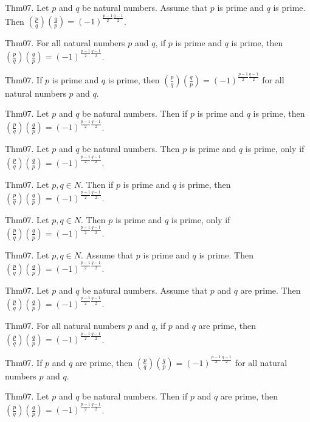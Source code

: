 \documentclass{article}
\begin{document}
Thm07. Let $p$ and $q$ be natural numbers. Assume that $p$ is prime and $q$ is prime. Then $\left(\frac{ p }{ q }\right) \left(\frac{ q }{ p }\right) = (- 1)^ {\frac{ p - 1}{2}\frac{ q - 1}{2}}$.

Thm07. For all natural numbers $p$ and $q$, if $p$ is prime and $q$ is prime, then $\left(\frac{ p }{ q }\right) \left(\frac{ q }{ p }\right) = (- 1)^ {\frac{ p - 1}{2}\frac{ q - 1}{2}}$.

Thm07. If $p$ is prime and $q$ is prime, then $\left(\frac{ p }{ q }\right) \left(\frac{ q }{ p }\right) = (- 1)^ {\frac{ p - 1}{2}\frac{ q - 1}{2}}$ for all natural numbers $p$ and $q$.

Thm07. Let $p$ and $q$ be natural numbers. Then if $p$ is prime and $q$ is prime, then $\left(\frac{ p }{ q }\right) \left(\frac{ q }{ p }\right) = (- 1)^ {\frac{ p - 1}{2}\frac{ q - 1}{2}}$.

Thm07. Let $p$ and $q$ be natural numbers. Then $p$ is prime and $q$ is prime, only if $\left(\frac{ p }{ q }\right) \left(\frac{ q }{ p }\right) = (- 1)^ {\frac{ p - 1}{2}\frac{ q - 1}{2}}$.

Thm07. Let $p , q \in N$. Then if $p$ is prime and $q$ is prime, then $\left(\frac{ p }{ q }\right) \left(\frac{ q }{ p }\right) = (- 1)^ {\frac{ p - 1}{2}\frac{ q - 1}{2}}$.

Thm07. Let $p , q \in N$. Then $p$ is prime and $q$ is prime, only if $\left(\frac{ p }{ q }\right) \left(\frac{ q }{ p }\right) = (- 1)^ {\frac{ p - 1}{2}\frac{ q - 1}{2}}$.

Thm07. Let $p , q \in N$. Assume that $p$ is prime and $q$ is prime. Then $\left(\frac{ p }{ q }\right) \left(\frac{ q }{ p }\right) = (- 1)^ {\frac{ p - 1}{2}\frac{ q - 1}{2}}$.

Thm07. Let $p$ and $q$ be natural numbers. Assume that $p$ and $q$ are prime. Then $\left(\frac{ p }{ q }\right) \left(\frac{ q }{ p }\right) = (- 1)^ {\frac{ p - 1}{2}\frac{ q - 1}{2}}$.

Thm07. For all natural numbers $p$ and $q$, if $p$ and $q$ are prime, then $\left(\frac{ p }{ q }\right) \left(\frac{ q }{ p }\right) = (- 1)^ {\frac{ p - 1}{2}\frac{ q - 1}{2}}$.

Thm07. If $p$ and $q$ are prime, then $\left(\frac{ p }{ q }\right) \left(\frac{ q }{ p }\right) = (- 1)^ {\frac{ p - 1}{2}\frac{ q - 1}{2}}$ for all natural numbers $p$ and $q$.

Thm07. Let $p$ and $q$ be natural numbers. Then if $p$ and $q$ are prime, then $\left(\frac{ p }{ q }\right) \left(\frac{ q }{ p }\right) = (- 1)^ {\frac{ p - 1}{2}\frac{ q - 1}{2}}$.
\end{document}
